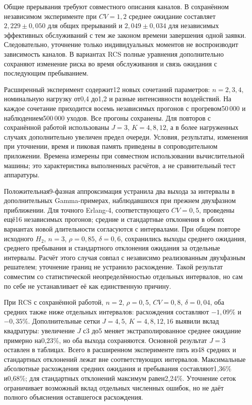 Общие прерывания требуют совместного описания каналов. В сохранённом независимом эксперименте при \(CV=1{,}2\) среднее ожидание составляет \(2{,}229\pm0{,}050\) для общих прерываний и \(2{,}049\pm0{,}034\) для независимых эффективных обслуживаний с тем же законом времени завершения одной заявки. Следовательно, уточнение только индивидуальных моментов не воспроизводит зависимость каналов. В вариантах RCS полные уравнения дополнительно сохраняют изменение риска во время обслуживания и связь ожидания с последующим пребыванием.

Расширенный эксперимент содержит12 новых сочетаний параметров: \(n=2,3,4\), номинальную нагрузку от0{,}4 до1{,}2 и разные интенсивности воздействий. На каждое сочетание приходится восемь независимых прогонов с прогревом50\,000 и наблюдением500\,000 уходов. Все прогоны сохранены. Для повторов с сохранённой работой использованы \(J=3\), \(K=4,8,12\), а в более нагруженных случаях дополнительно увеличен предел очереди. Условия, результаты, изменения при уточнении, время и пиковая память приведены в сопроводительном приложении. Времена измерены при совместном использовании вычислительной машины; это характеристика выполненных расчётов, а не сравнительный тест аппаратуры.

Положительная9-фазная аппроксимация устранила два выхода за интервалы в дополнительных Gamma-примерах, наблюдавшихся при прежнем двухфазном приближении. Для точного Erlang-4, соответствующего \(CV=0{,}5\), проведены ещё16 независимых прогонов; средние и стандартные отклонения в обоих вариантах новой длительности согласуются с интервалами. При общем повторе исходного \(H_2\), \(n=3\), \(\rho=0{,}85\), \(\delta=0{,}6\), сохранились выходы среднего ожидания, среднего пребывания и стандартного отклонения ожидания за отдельные интервалы. Расчёт этого случая совпал с независимо реализованным двухфазным решателем; уточнение границ не устранило расхождение. Такой результат совместим со статистической неопределённостью отдельных интервалов, но сам по себе не устанавливает её как единственную причину.

При RCS с сохранённой работой, \(n=2\), \(\rho=0{,}5\), \(CV=0{,}8\), \(\delta=0{,}04\), оба средних также ниже отдельных интервалов: расхождения составляют \(-1{,}09\%\) и \(-0{,}35\%\). Дополнительные сетки \(J=4,5\), \(K=4,8,12,16\) выявили вклад квадратуры: увеличение \(J\) с3 до5 меняет экстраполированное среднее ожидание примерно на0{,}23\%, но оба выхода сохраняются. Основной результат \(J=3\) оставлен в таблицах. Всего в расширенном эксперименте пять из48 средних и стандартных отклонений лежат вне соответствующих интервалов. Максимальные абсолютные расхождения средних ожидания и пребывания составляют1{,}36\% и0{,}68\%; для стандартных отклонений максимум равен2{,}24\%. Уточнение сеток ограничивает возможный вклад отдельных численных ошибок, но не даёт полного объяснения оставшегося расхождения.

